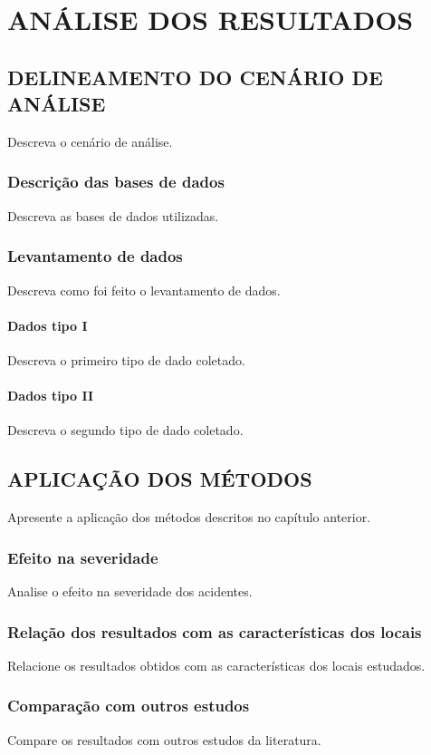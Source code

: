 \chapter{ANÁLISE DOS RESULTADOS}
\label{capitulo4}

\section{DELINEAMENTO DO CENÁRIO DE ANÁLISE}

Descreva o cenário de análise.

\subsection{Descrição das bases de dados}

Descreva as bases de dados utilizadas.

\subsection{Levantamento de dados}

Descreva como foi feito o levantamento de dados.

\subsubsection{Dados tipo I}

Descreva o primeiro tipo de dado coletado.

\subsubsection{Dados tipo II}

Descreva o segundo tipo de dado coletado.

\section{APLICAÇÃO DOS MÉTODOS}

Apresente a aplicação dos métodos descritos no capítulo anterior.

\subsection{Efeito na severidade}

Analise o efeito na severidade dos acidentes.

\subsection{Relação dos resultados com as características dos locais}

Relacione os resultados obtidos com as características dos locais estudados.

\subsection{Comparação com outros estudos}

Compare os resultados com outros estudos da literatura.
